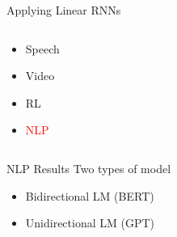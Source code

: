 \begin{frame}{Applying Linear RNNs}
     \vspace{1cm}
     \begin{columns}
     \begin{column}{0.6\textwidth}         
     \begin{itemize}
         \item Speech~\cite{goel2022s}
         \item Video~\cite{Nguyen2022-qi}
         \item RL~\cite{Lu2023-ov}
         \item \textcolor{red}{NLP} 
     \end{itemize}
     \end{column}         

     \end{columns}    
\end{frame}

\begin{frame}{NLP Results}
    Two types of model
        \vspace{1cm}

    \begin{itemize}
        \item Bidirectional LM (BERT)
        \item Unidirectional LM (GPT)
    \end{itemize}
    \vspace{1cm}
    
    
\end{frame}


